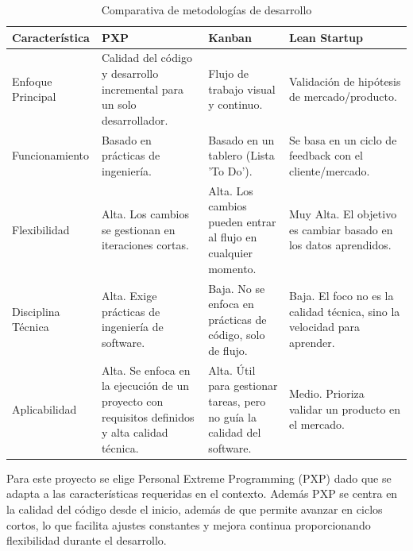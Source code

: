 ﻿\documentclass{iccmemoria}
\begin{document}
\begin{table}[H]
    \centering
    \caption{Comparativa de metodologías de desarrollo}
    \label{tab:comparativa_metodologías_de_desarrollo} 
    
    \begin{tabular}{|p{3cm}|p{3.5cm}|p{3.5cm}|p{3.5cm}|} 
        \hline %
        
        \textbf{Característica} & \textbf{PXP} & \textbf{Kanban}  & \textbf{Lean Startup}\\
        \hline %
        
Enfoque Principal & Calidad del código y desarrollo incremental para un solo desarrollador. & Flujo de trabajo visual y continuo. & Validación de hipótesis de mercado/producto.\\
\hline
Funcionamiento &  Basado en prácticas de ingeniería. & Basado en un tablero (Lista 'To Do'). & Se basa en un ciclo de feedback con el cliente/mercado.\\
\hline
Flexibilidad & Alta. Los cambios se gestionan en iteraciones cortas. & Alta. Los cambios pueden entrar al flujo en cualquier momento. & Muy Alta. El objetivo es cambiar basado en los datos aprendidos.\\
\hline
Disciplina Técnica & Alta. Exige prácticas de ingeniería de software. & Baja. No se enfoca en prácticas de código, solo de flujo. & Baja. El foco no es la calidad técnica, sino la velocidad para aprender.\\
\hline
Aplicabilidad & Alta. Se enfoca en la ejecución de un proyecto con requisitos definidos y alta calidad técnica. & Alta. Útil para gestionar tareas, pero no guía la calidad del software. & Medio. Prioriza   validar un producto en el mercado.\\
        
        \hline %
    \end{tabular}
\end{table}

\noindent Para este proyecto se elige Personal Extreme Programming (PXP) dado que se adapta a las características requeridas en el contexto. Además PXP se centra en la calidad del código desde el inicio, además de que permite avanzar en ciclos cortos, lo que facilita ajustes constantes y mejora continua proporcionando flexibilidad durante el desarrollo.\\
\end{document}
